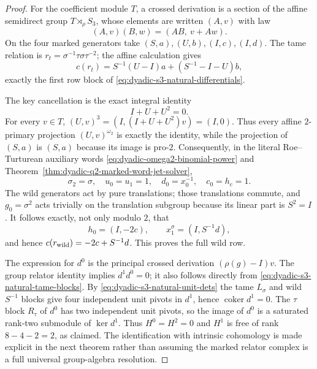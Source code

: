 \begin{proof}
For the coefficient module $T$,
a crossed derivation is a section
of the affine semidirect group
$T\rtimes_\rho S_3$, whose elements
are written $(A,v)$ with law
\[
(A,v)(B,w)=(AB,\ v+Aw).
\]
On the four marked generators
take $(S,a),(U,b),(I,c),(I,d)$.
The tame relation is
$r_t=\sigma^{-1}\tau\sigma\tau^{-2}$;
the affine calculation gives
\[
c(r_t)
=S^{-1}(U-I)a+(S^{-1}-I-U)b,
\]
exactly the first row block of
\eqref{eq:dyadic-s3-natural-differentials}.

The key cancellation is the exact
integral identity
\[
I+U+U^2=0.
\]
For every $v\in T$,
$(U,v)^3=(I,(I+U+U^2)v)=(I,0)$.
Thus every affine $2$-primary
projection $(U,v)^{\omega_2}$
is exactly the identity, while
the projection of $(S,a)$ is
$(S,a)$ because its image
is pro-$2$.
Consequently, in the literal
Roe--Turturean auxiliary words
\eqref{eq:dyadic-omega2-binomial-power}
and Theorem~\ref{thm:dyadic-q2-marked-word-jet-solver},
\[
\sigma_2=\sigma,\quad
u_0=u_1=1,\quad
d_0=x_0^{-1},\quad c_0=h_c=1.
\]
The wild generators act by pure
translations; those translations
commute, and $g_0=\sigma^2$
acts trivially on the translation
subgroup because its linear part
is $S^2=I$.
It follows exactly, not only
modulo $2$, that
\[
h_0=(I,-2c),\qquad
x_1^\sigma=(I,S^{-1}d),
\]
and hence
$c(r_{\rm wild})=-2c+S^{-1}d$.
This proves the full wild row.

The expression for $d^0$
is the principal crossed
derivation $(\rho(g)-I)v$.
The group relator identity implies
$d^1d^0=0$; it also follows
directly from
\eqref{eq:dyadic-s3-natural-tame-blocks}.
By \eqref{eq:dyadic-s3-natural-unit-dets}
the tame $L_\sigma$ and wild
$S^{-1}$ blocks give four
independent unit pivots in
$d^1$, hence $\operatorname{coker}d^1=0$.
The $\tau$ block $R_\tau$
of $d^0$ has two independent
unit pivots, so the image
of $d^0$ is a saturated rank-two
submodule of $\ker d^1$.
Thus $H^0=H^2=0$ and
$H^1$ is free of rank
$8-4-2=2$, as claimed.
The identification with intrinsic
cohomology is made explicit in
the next theorem rather than
assuming the marked relator
complex is a full universal
group-algebra resolution.
\end{proof}

